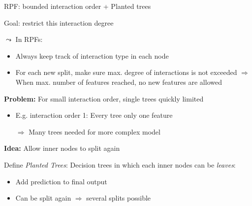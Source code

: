 \documentclass[10pt,compress,t,notes=noshow, xcolor=table]{beamer}
\begin{document}
\begin{frame}{RPF: bounded interaction order + Planted trees}

    Goal: restrict this interaction degree
    
    $\leadsto$ In RPFs: 

    \begin{itemize}
        \item Always keep track of interaction type in each node
        
        \item For each new split, make sure max. degree of interactions is not exceeded $\Rightarrow$ When max. number of features reached, no new features are allowed
    \end{itemize}

    \textbf{Problem: } For small interaction order, single trees quickly limited

    \begin{itemize}
        \item E.g. interaction order 1: Every tree only one feature
        \item[$\Rightarrow$] Many trees needed for more complex model
    \end{itemize}

    \textbf{Idea:} Allow inner nodes to split again

    Define \textit{Planted Trees}: Decision trees in which each inner nodes can be \textit{leaves}:
    \begin{itemize}
        \item Add prediction to final output
        \item Can be split again $\Rightarrow$ several splits possible
    \end{itemize}
    
\end{frame}


\end{document}
